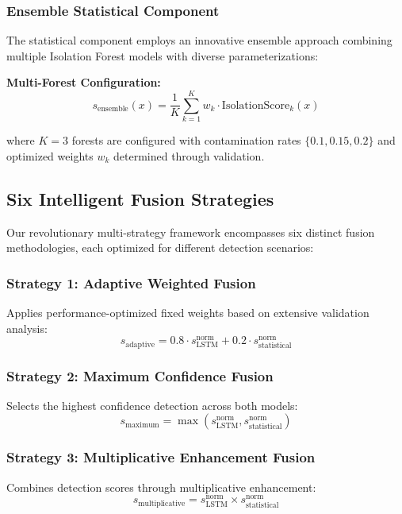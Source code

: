 \documentclass[conference]{IEEEtran}
\begin{document}
\subsubsection{Ensemble Statistical Component}

The statistical component employs an innovative ensemble approach combining multiple Isolation Forest models with diverse parameterizations:

\textbf{Multi-Forest Configuration:}
\begin{equation}
s_{\text{ensemble}}(x) = \frac{1}{K} \sum_{k=1}^{K} w_k \cdot \text{IsolationScore}_k(x)
\end{equation}

where $K=3$ forests are configured with contamination rates $\{0.1, 0.15, 0.2\}$ and optimized weights $w_k$ determined through validation.

\subsection{Six Intelligent Fusion Strategies}

Our revolutionary multi-strategy framework encompasses six distinct fusion methodologies, each optimized for different detection scenarios:

\subsubsection{Strategy 1: Adaptive Weighted Fusion}
Applies performance-optimized fixed weights based on extensive validation analysis:
\begin{equation}
s_{\text{adaptive}} = 0.8 \cdot s_{\text{LSTM}}^{\text{norm}} + 0.2 \cdot s_{\text{statistical}}^{\text{norm}}
\end{equation}

\subsubsection{Strategy 2: Maximum Confidence Fusion}
Selects the highest confidence detection across both models:
\begin{equation}
s_{\text{maximum}} = \max(s_{\text{LSTM}}^{\text{norm}}, s_{\text{statistical}}^{\text{norm}})
\end{equation}

\subsubsection{Strategy 3: Multiplicative Enhancement Fusion}
Combines detection scores through multiplicative enhancement:
\begin{equation}
s_{\text{multiplicative}} = s_{\text{LSTM}}^{\text{norm}} \times s_{\text{statistical}}^{\text{norm}}
\end{equation}
\end{document}
